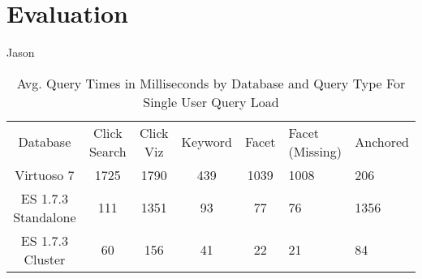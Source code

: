 \section{Evaluation}
\label{sec:evaluation}
Jason


 \begin{table} 
    \begin{tabular}{ c c c c c }
        Database & Click Search & Click Viz & Keyword & Facet & Facet (Missing) & Anchored \\ 
        Virtuoso 7 & 1725 & 1790 & 439 & 1039 & 1008 & 206 \\ 
        ES 1.7.3 Standalone & 111 & 1351 & 93 & 77 & 76 & 1356 \\ 
        ES 1.7.3 Cluster & 60 & 156 & 41 & 22 & 21 & 84 \\ 
    \end{tabular} 
    \caption{Avg. Query Times in Milliseconds by Database and Query Type For Single User Query Load}
    \label{table:qt_single_user}
\end{table}

